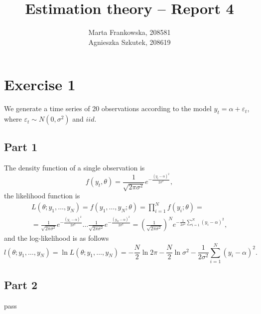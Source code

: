 \documentclass[12pt, a4paper]{article}\usepackage[]{graphicx}\usepackage[]{color}
\begin{document}
\title{Estimation theory -- Report 4}
\author{Marta Frankowska, 208581 \\ Agnieszka Szkutek, 208619}
\maketitle
\tableofcontents 



\section{Exercise 1}
We generate a time series of 20 observations according to the model $y_t = \alpha + \varepsilon_t$, where $\varepsilon_t \sim N(0,\sigma^2)$ and $iid$.

\subsection{Part 1}
The density function of a single observation is 
\[ f(y_t,\theta) = \frac{1}{\sqrt{2\pi\sigma^2}} e^{-\frac{(y_t-\alpha)^2}{2\sigma^2}},  \]
the likelihood function is 
\begin{gather*} 
L(\theta; y_1,\dots,y_N) = f(y_1,\dots,y_N; \theta) = \prod_{i=1}^{N} f(y_i; \theta) = \\
= \frac{1}{\sqrt{2\pi\sigma^2}} e^{-\frac{(y_1-\alpha)^2}{2\sigma^2}} \dots  \frac{1}{\sqrt{2\pi\sigma^2}} e^{-\frac{(y_N-\alpha)^2}{2\sigma^2}}
=  \left(\frac{1}{\sqrt{2\pi\sigma^2}} \right)^N e^{-\frac{1}{2\sigma^2} \sum_{i=1}^N (y_i-\alpha)^2} ,
\end{gather*}
and the log-likelihood is as follows
\[ l(\theta; y_1,\dots,y_N) = \ln{L(\theta; y_1,\dots,y_N)} = -\frac{N}{2} \ln{2\pi} -\frac{N}{2} \ln{\sigma^2} -\frac{1}{2\sigma^2} \sum_{i=1}^N (y_i-\alpha)^2.\]


\subsection{Part 2}
pass
\end{document}
